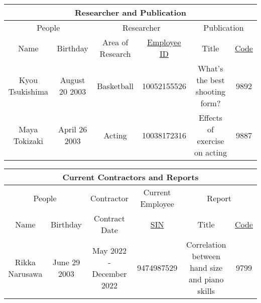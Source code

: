 \documentclass[12pt]{article}
\begin{document}
\begin{center}
    \begin{tabular}{|c|c||c|c||c | c|}
        \hline
        \multicolumn{6}{|c|}{\cellcolor{gray!25}Researcher and Publication}                                                                      \\
        \hline
        \hline
        \multicolumn{2}{|c||}{\cellcolor{gray!25}People}
                        & \multicolumn{2}{c||}{\cellcolor{gray!25}Researcher}
                        & \multicolumn{2}{c|}{\cellcolor{gray!25}Publication}                                                                    \\
        \hline
        \cellcolor{gray!25} Name
                        & \cellcolor{gray!25}Birthday
                        & \cellcolor{gray!25}Area of Research
                        & \cellcolor{gray!25}\underline{Employee ID}
                        & \cellcolor{gray!25}Title
                        & \cellcolor{gray!25}\underline{Code}                                                                                    \\
        \hline \hline
        Kyou Tsukishima & August 20 2003                                      & Basketball & 10052155526 & What's the best shooting form? & 9892 \\ \hline
        Maya Tokizaki   & April 26 2003                                       & Acting     & 10038172316 & Effects of exercise on acting  & 9887 \\ \hline
    \end{tabular}
\end{center}
\begin{center}
    \begin{tabular}{|c|c||c||c ||c| c|}
        \hline
        \multicolumn{6}{|c|}{\cellcolor{gray!25}Current Contractors and Reports}                                                                                        \\
        \hline
        \hline
        \multicolumn{2}{|c||}{\cellcolor{gray!25}People}
                       & {\cellcolor{gray!25}Contractor}
                       & {\cellcolor{gray!25}Current Employee}
                       & \multicolumn{2}{c|}{\cellcolor{gray!25}Report}                                                                                                 \\
        \hline
        \cellcolor{gray!25} Name
                       & \cellcolor{gray!25}Birthday
                       & \cellcolor{gray!25}Contract Date
                       & \cellcolor{gray!25}\underline{SIN}
                       & \cellcolor{gray!25}Title
                       & \cellcolor{gray!25}\underline{Code}                                                                                                            \\
        \hline \hline
        Rikka Narusawa & June 29 2003                                   & May 2022 - December 2022 & 9474987529 & Correlation between hand size and piano skills & 9799 \\ \hline
    \end{tabular}
\end{center}
\end{document}
